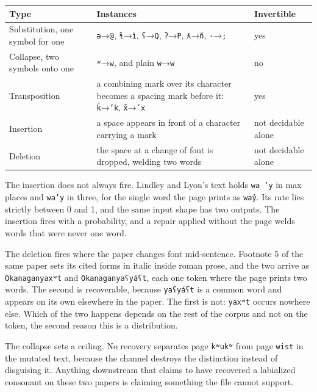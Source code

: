 \tiny
\setlength{\tabcolsep}{2pt}
\begin{longtable}{@{}>{\raggedright\arraybackslash}p{}>{\raggedright\arraybackslash}p{}>{\raggedright\arraybackslash}p{}@{}}
\toprule
Type & Instances & Invertible \\
\midrule
Substitution, one symbol for one & \texttt{ə}→\texttt{@}, \texttt{ɬ}→\texttt{ì}, \texttt{ʕ}→\texttt{Q}, \texttt{ʔ}→\texttt{P}, \texttt{ƛ}→\texttt{ň}, \texttt{·}→\texttt{;} & yes \\
Collapse, two symbols onto one & \texttt{ʷ}→\texttt{w}, and plain \texttt{w}→\texttt{w} & no \\
Transposition & a combining mark over its character becomes a spacing mark before it: \texttt{k̓}→\texttt{’k}, \texttt{x̌}→\texttt{ˇx} & yes \\
Insertion & a space appears in front of a character carrying a mark & not decidable alone \\
Deletion & the space at a change of font is dropped, welding two words & not decidable alone \\
\bottomrule
\end{longtable}
\normalsize

The insertion does not always fire. Lindley and Lyon's text holds \texttt{wa ’y} in max places and \texttt{wa’y} in three, for the single word the page prints as \texttt{way̓}. Its rate lies strictly between 0 and 1, and the same input shape has two outputs. The insertion fires with a probability, and a repair applied without the page welds words that were never one word.

The deletion fires where the paper changes font mid-sentence. Footnote 5 of the same paper sets its cited forms in italic inside roman prose, and the two arrive as \texttt{Okanaganyaxʷt} and \texttt{Okanaganyaʕyáʕt}, each one token where the page prints two words. The second is recoverable, because \texttt{yaʕyáʕt} is a common word and appears on its own elsewhere in the paper. The first is not: \texttt{yaxʷt} occurs nowhere else. Which of the two happens depends on the rest of the corpus and not on the token, the second reason this is a distribution.

The collapse sets a ceiling. No recovery separates page \texttt{kʷukʷ} from page \texttt{wist} in the mutated text, because the channel destroys the distinction instead of disguising it. Anything downstream that claims to have recovered a labialized consonant on these two papers is claiming something the file cannot support.

